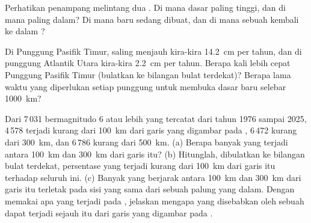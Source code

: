 \begin{exercise}[$\star\star$]\label{exo:g7:plate-tectonics:10}
Perhatikan penampang melintang dua . Di mana dasar  paling
tinggi, dan di mana paling dalam? Di mana  baru sedang dibuat, dan di
mana sebuah  kembali ke dalam ?
\end{exercise}

\begin{exercise}[$\star\star\star$]\label{exo:g7:plate-tectonics:11}
Di Punggung Pasifik Timur,  saling menjauh kira-kira
\qty{14.2}{cm} per tahun, dan di punggung Atlantik Utara kira-kira
\qty{2.2}{cm} per tahun. Berapa kali lebih cepat Punggung Pasifik Timur
(bulatkan ke bilangan bulat terdekat)? Berapa lama waktu yang diperlukan
setiap punggung untuk membuka dasar  baru selebar \qty{1000}{km}?
\end{exercise}

\begin{exercise}[$\star\star\star$]\label{exo:g7:plate-tectonics:12}
Dari 7\,031  bermagnitudo 6 atau lebih yang tercatat dari tahun
1976 sampai 2025, 4\,578 terjadi kurang dari \qty{100}{km} dari garis  yang digambar pada , 6\,472 kurang dari \qty{300}{km}, dan
6\,786 kurang dari \qty{500}{km}.
(a) Berapa banyak yang terjadi antara \qty{100}{km} dan \qty{300}{km} dari
garis itu? (b) Hitunglah, dibulatkan ke bilangan bulat terdekat, persentase
 yang terjadi kurang dari \qty{100}{km} dari garis itu terhadap
seluruh  ini. (c) Banyak  yang berjarak antara
\qty{100}{km} dan \qty{300}{km} dari garis itu terletak pada sisi yang sama
dari sebuah palung  yang dalam. Dengan memakai apa yang terjadi pada
, jelaskan mengapa  yang disebabkan oleh sebuah
 dapat terjadi sejauh itu dari garis yang digambar pada .
\end{exercise}

